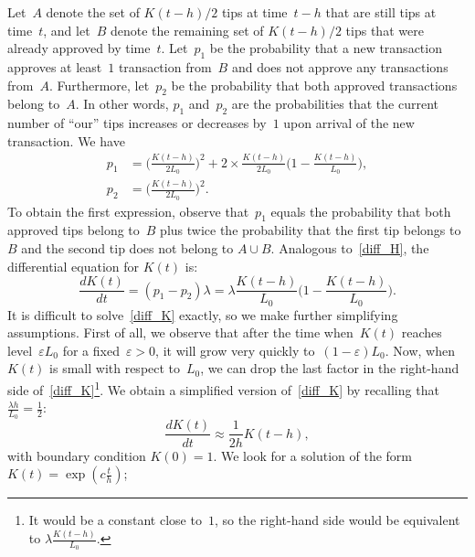 \documentclass[12pt]{article}
\newcommand{\eps}{\varepsilon}
\begin{document}
Let~$A$ denote
the set of  
$K(t-h)/2$ tips at time~$t-h$
that are still tips at time~$t$, and let~$B$ denote the remaining 
set of $K(t-h)/2$ tips that were already approved by time~$t$.
Let~$p_1$ be the probability that a new transaction
approves at least~$1$ transaction from~$B$
and does not approve any transactions from~$A$. Furthermore,
let~$p_2$ be the probability that both approved transactions
belong to~$A$. In other words, $p_1$ and~$p_2$ are
the probabilities that the current number of ``our'' tips
increases or decreases by~$1$ upon arrival of the new transaction. 
We have
\begin{align*}
 p_1 &= \Big(\frac{K(t-h)}{2 L_0}\Big)^2 + 2\times
\frac{K(t-h)}{2 L_0}\Big(1-\frac{K(t-h)}{L_0}\Big),  \\
 p_2 &= \Big(\frac{K(t-h)}{2 L_0}\Big)^2.
\end{align*}
To obtain the first expression, observe that~$p_1$
equals the probability that both approved tips 
belong to~$B$ plus twice the probability that the first
tip belongs to~$B$ and the second tip does not 
belong to $A\cup B$.
Analogous to~\eqref{diff_H},
the differential equation for $K(t)$ is:
\begin{equation}
\label{diff_K}
 \frac{d K(t)}{dt} = (p_1-p_2)\lambda = \lambda
 \frac{K(t-h)}{ L_0}\Big(1-\frac{K(t-h)}{L_0}\Big).
\end{equation}
It is difficult to solve~\eqref{diff_K} exactly,
so we make further simplifying assumptions.
First of all, we observe that after the time when~$K(t)$
reaches level~$\eps L_0$ for a fixed~$\eps>0$, it will grow 
very quickly to~$(1-\eps)L_0$. 
Now, when~$K(t)$ is small with respect to~$L_0$, 
we can drop the last factor in the right-hand side of~\eqref{diff_K}\footnote{It 
would be a constant close to~$1$, so the 
right-hand side would be equivalent to 
$\lambda\frac{K(t-h)}{ L_0}$.}.
We obtain a simplified version of~\eqref{diff_K}
by recalling that $\frac{\lambda h}{L_0}=\frac{1}{2}$:
\begin{equation}
\label{diff_K_simpl}
 \frac{d K(t)}{dt} \approx \frac{1}{2h}K(t-h),
\end{equation}
with boundary condition $K(0)=1$. 
We look for a solution of the form $K(t)=\exp(c\frac{t}{h})$;
\end{document}
